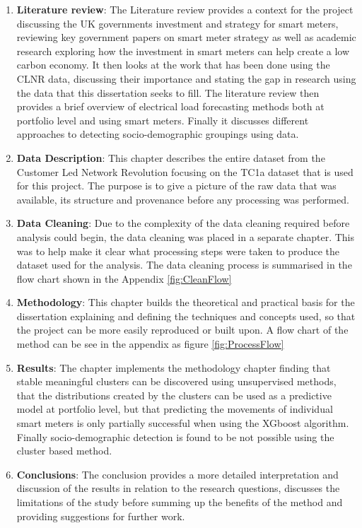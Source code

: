 \begin{enumerate}
\setcounter{enumi}{0}
\item \textbf{Literature review}: The Literature review provides a context for the project discussing the UK governments investment and strategy for smart meters, reviewing key government papers on smart meter strategy as well as academic research exploring how the investment in smart meters can help create a low carbon economy. It then looks at the work that has been done using the CLNR data, discussing their importance and stating the gap in research using the data that this dissertation seeks to fill. The literature review then provides a brief overview of electrical load forecasting methods both at portfolio level and using smart meters. Finally it discusses different approaches to detecting socio-demographic groupings using data.

\item \textbf{Data Description}: This chapter describes the entire dataset from the Customer Led Network Revolution focusing on the TC1a dataset that is used for this project. The purpose is to give a picture of the raw data that was available, its structure and provenance before any processing was performed. 

\item \textbf{Data Cleaning}: Due to the complexity of the data cleaning required before analysis could begin, the data cleaning was placed in a separate chapter. This was to help make it clear what processing steps were taken to produce the dataset used for the analysis. The data cleaning process is summarised in the flow chart shown in the Appendix \ref{fig:CleanFlow}


\item \textbf{Methodology}: This chapter builds the theoretical and practical basis for the dissertation explaining and defining the techniques and concepts used, so that the project can be more easily reproduced or built upon. A flow chart of the method can be see in the appendix as figure \ref{fig:ProcessFlow}

\item \textbf{Results}: The chapter implements the methodology chapter finding that stable meaningful clusters can be discovered using unsupervised methods, that the distributions created by the clusters can be used as a predictive model at portfolio level, but that predicting the movements of individual smart meters is only partially successful when using the XGboost algorithm. Finally socio-demographic detection is found to be not possible using the cluster based method.

\item \textbf{Conclusions}: The conclusion provides a more detailed interpretation and discussion of the results in relation to the research questions, discusses the limitations of the study before summing up the benefits of the method and providing suggestions for further work.

\end{enumerate}


